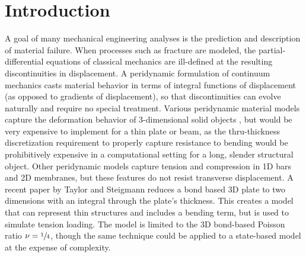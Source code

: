 \documentclass[preprint,review,12pt]{elsarticle}
\begin{document}
\section{Introduction}
A goal of many mechanical engineering analyses is the prediction and description of material failure.
When processes such as fracture are modeled, the partial-differential equations of classical mechanics are ill-defined at the resulting discontinuities in displacement.  
A peridynamic formulation of continuum mechanics casts material behavior in terms of integral functions of displacement (as opposed to gradients of displacement), so that discontinuities can evolve naturally and require no special treatment.  
Various peridynamic material models capture the deformation behavior of 3-dimensional solid objects \cite{silling2007peridynamic, silling2005meshfree, gerstle2007peridynamic}, but would be very expensive to implement for a thin plate or beam, as the thru-thickness discretization requirement to properly capture resistance to bending would be prohibitively expensive in a computational setting for a long, slender structural object.  
Other peridynamic models capture tension and compression in 1D bars\cite{silling2003deformation} and 2D membranes\cite{silling2005peridynamic}, but these features do not resist transverse displacement.  
A recent paper by Taylor and Steigmann \cite{taylor2013two} reduces a bond based 3D plate to two dimensions with an integral through the plate's thickness. 
This creates a model that can represent thin structures and includes a bending term, but is used to simulate tension loading. 
The model is limited to the 3D bond-based Poisson ratio \(\nu=\sfrac{1}{4}\), though the same technique could be applied to a state-based model at the expense of complexity.
\end{document}
